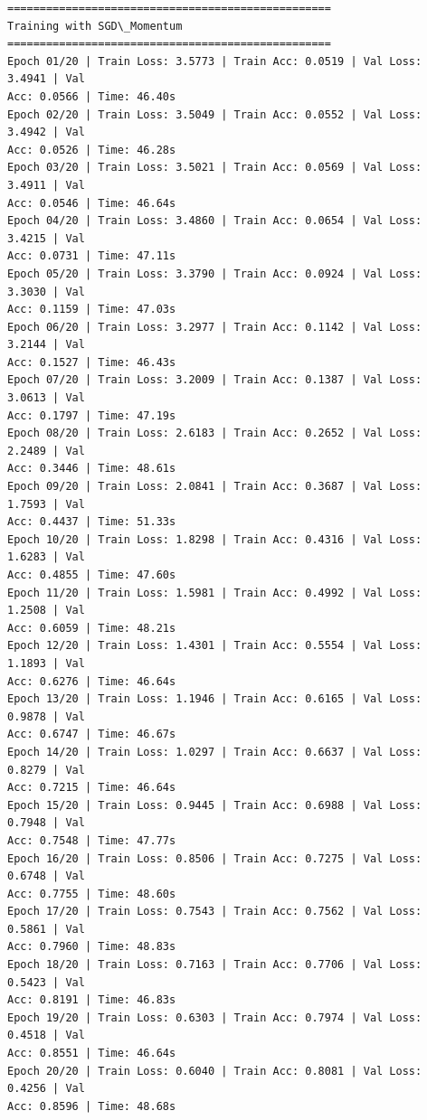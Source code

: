 \documentclass[11pt]{article}
\begin{document}
\begin{Verbatim}[commandchars=\\\{\}]
==================================================
Training with SGD\_Momentum
==================================================
Epoch 01/20 | Train Loss: 3.5773 | Train Acc: 0.0519 | Val Loss: 3.4941 | Val
Acc: 0.0566 | Time: 46.40s
Epoch 02/20 | Train Loss: 3.5049 | Train Acc: 0.0552 | Val Loss: 3.4942 | Val
Acc: 0.0526 | Time: 46.28s
Epoch 03/20 | Train Loss: 3.5021 | Train Acc: 0.0569 | Val Loss: 3.4911 | Val
Acc: 0.0546 | Time: 46.64s
Epoch 04/20 | Train Loss: 3.4860 | Train Acc: 0.0654 | Val Loss: 3.4215 | Val
Acc: 0.0731 | Time: 47.11s
Epoch 05/20 | Train Loss: 3.3790 | Train Acc: 0.0924 | Val Loss: 3.3030 | Val
Acc: 0.1159 | Time: 47.03s
Epoch 06/20 | Train Loss: 3.2977 | Train Acc: 0.1142 | Val Loss: 3.2144 | Val
Acc: 0.1527 | Time: 46.43s
Epoch 07/20 | Train Loss: 3.2009 | Train Acc: 0.1387 | Val Loss: 3.0613 | Val
Acc: 0.1797 | Time: 47.19s
Epoch 08/20 | Train Loss: 2.6183 | Train Acc: 0.2652 | Val Loss: 2.2489 | Val
Acc: 0.3446 | Time: 48.61s
Epoch 09/20 | Train Loss: 2.0841 | Train Acc: 0.3687 | Val Loss: 1.7593 | Val
Acc: 0.4437 | Time: 51.33s
Epoch 10/20 | Train Loss: 1.8298 | Train Acc: 0.4316 | Val Loss: 1.6283 | Val
Acc: 0.4855 | Time: 47.60s
Epoch 11/20 | Train Loss: 1.5981 | Train Acc: 0.4992 | Val Loss: 1.2508 | Val
Acc: 0.6059 | Time: 48.21s
Epoch 12/20 | Train Loss: 1.4301 | Train Acc: 0.5554 | Val Loss: 1.1893 | Val
Acc: 0.6276 | Time: 46.64s
Epoch 13/20 | Train Loss: 1.1946 | Train Acc: 0.6165 | Val Loss: 0.9878 | Val
Acc: 0.6747 | Time: 46.67s
Epoch 14/20 | Train Loss: 1.0297 | Train Acc: 0.6637 | Val Loss: 0.8279 | Val
Acc: 0.7215 | Time: 46.64s
Epoch 15/20 | Train Loss: 0.9445 | Train Acc: 0.6988 | Val Loss: 0.7948 | Val
Acc: 0.7548 | Time: 47.77s
Epoch 16/20 | Train Loss: 0.8506 | Train Acc: 0.7275 | Val Loss: 0.6748 | Val
Acc: 0.7755 | Time: 48.60s
Epoch 17/20 | Train Loss: 0.7543 | Train Acc: 0.7562 | Val Loss: 0.5861 | Val
Acc: 0.7960 | Time: 48.83s
Epoch 18/20 | Train Loss: 0.7163 | Train Acc: 0.7706 | Val Loss: 0.5423 | Val
Acc: 0.8191 | Time: 46.83s
Epoch 19/20 | Train Loss: 0.6303 | Train Acc: 0.7974 | Val Loss: 0.4518 | Val
Acc: 0.8551 | Time: 46.64s
Epoch 20/20 | Train Loss: 0.6040 | Train Acc: 0.8081 | Val Loss: 0.4256 | Val
Acc: 0.8596 | Time: 48.68s
    \end{Verbatim}
\end{document}
